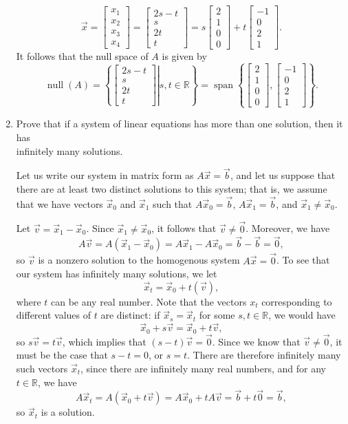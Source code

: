 \documentclass[letterpaper,12pt,reqno]{amsart}
\newcommand{\R}{\mathbb{R}}
\newcommand{\bbm}{\begin{bmatrix}}
\newcommand{\ebm}{\end{bmatrix}}
\begin{document}
\begin{enumerate}
\[
 \vec{x} = \bbm x_1\\x_2\\x_3\\x_4\ebm = \bbm 2s-t\\s\\2t\\t\ebm = s\bbm 2\\1\\0\\0\ebm + t\bbm -1\\0\\2\\1\ebm.
\]
It follows that the null space of $A$ is given by
\[
 \operatorname{null}(A) = \left\{\left. \bbm 2s-t\\s\\2t\\t\ebm \right| s,t\in\R\right\} = \operatorname{span}\left\{\bbm 2\\1\\0\\0\ebm, \bbm -1\\0\\2\\1\ebm\right\}.
\]


\bigskip


\item Prove that if a system of linear equations has more than one solution, then it has\\infinitely many solutions.

\bigskip

Let us write our system in matrix form as $A\vec{x}=\vec{b}$, and let us suppose that there are at least two distinct solutions to this system; that is, we assume that we have vectors $\vec{x}_0$ and $\vec{x}_1$ such that $A\vec{x}_0=\vec{b}$, $A\vec{x}_1=\vec{b}$, and $\vec{x}_1\neq \vec{x}_0$.

Let $\vec{v} = \vec{x}_1-\vec{x}_0$. Since $\vec{x}_1\neq \vec{x}_0$, it follows that $\vec{v}\neq \vec{0}$. Moreover, we have
\[
 A\vec{v} = A(\vec{x}_1-\vec{x}_0) = A\vec{x}_1-A\vec{x}_0 = \vec{b}-\vec{b} = \vec{0},
\]
so $\vec{v}$ is a nonzero solution to the homogenous system $A\vec{x}=\vec{0}$. To see that our system has infinitely many solutions, we let
\[
 \vec{x}_t = \vec{x}_0+t(\vec{v}),
\]
where $t$ can be any real number. Note that the vectors $x_t$ corresponding to different values of $t$ are distinct: if $\vec{x}_s = \vec{x}_t$ for some $s,t\in\R$, we would have
\[
 \vec{x}_0+s\vec{v} = \vec{x}_0+t\vec{v},
\]
so $s\vec{v}=t\vec{v}$, which implies that $(s-t)\vec{v}=\vec{0}$. Since we know that $\vec{v}\neq \vec{0}$, it must be the case that $s-t=0$, or $s=t$. There are therefore infinitely many such vectors $\vec{x}_t$, since there are infinitely many real numbers, and for any $t\in\R$, we have
\[
 A\vec{x}_t = A(\vec{x}_0+t\vec{v})=A\vec{x}_0 + tA\vec{v} = \vec{b}+t\vec{0} = \vec{b},
\]
so $\vec{x}_t$ is a solution.


\end{enumerate}
\end{document}
